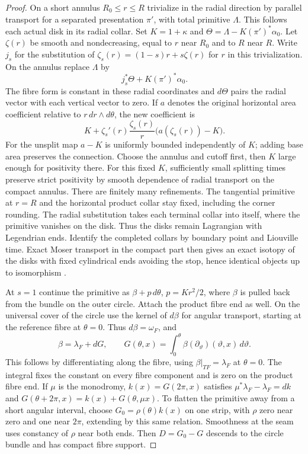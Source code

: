 \begin{proof}
On a short annulus $R_0\le r\le R$ trivialize in the radial direction by parallel transport for a separated presentation $\pi'$, with total primitive $\Lambda$. This follows each actual disk in its radial collar. Set $K=1+\kappa$ and $\Theta=\Lambda-K(\pi')^*\alpha_0$. Let $\zeta(r)$ be smooth and nondecreasing, equal to $r$ near $R_0$ and to $R$ near $R$. Write $j_s$ for the substitution of $\zeta_s(r)=(1-s)r+s\zeta(r)$ for $r$ in this trivialization. On the annulus replace $\Lambda$ by
\[
                         j_s^*\Theta+K(\pi')^*\alpha_0.
\]
The fibre form is constant in these radial coordinates and $d\Theta$ pairs the radial vector with each vertical vector to zero. If $a$ denotes the original horizontal area coefficient relative to $r\,dr\wedge d\theta$, the new coefficient is
\[
              K+\zeta_s'(r)\frac{\zeta_s(r)}{r}
                              \big(a(\zeta_s(r))-K\big).
\]
For the unsplit map $a-K$ is uniformly bounded independently of $K$; adding base area preserves the connection. Choose the annulus and cutoff first, then $K$ large enough for positivity there. For this fixed $K$, sufficiently small splitting times preserve strict positivity by smooth dependence of radial transport on the compact annulus. There are finitely many refinements. The tangential primitive at $r=R$ and the horizontal product collar stay fixed, including the corner rounding. The radial substitution takes each terminal collar into itself, where the primitive vanishes on the disk. Thus the disks remain Lagrangian with Legendrian ends. Identify the completed collars by boundary point and Liouville time. Exact Moser transport in the compact part then gives an exact isotopy of the disks with fixed cylindrical ends avoiding the stop, hence identical objects up to isomorphism \cite[Remark~2.30]{GPS}.

At $s=1$ continue the primitive as $\beta+p\,d\theta$, $p=Kr^2/2$, where $\beta$ is pulled back from the bundle on the outer circle. Attach the product fibre end as well. On the universal cover of the circle use the kernel of $d\beta$ for angular transport, starting at the reference fibre at $\theta=0$. Thus $d\beta=\omega_F$, and
\[
       \beta=\lambda_F+dG,\qquad
       G(\theta,x)=\int_0^\theta\beta(\partial_\vartheta)(\vartheta,x)\,d\vartheta .
\]
This follows by differentiating along the fibre, using $\beta|_{TF}=\lambda_F$ at $\theta=0$. The integral fixes the constant on every fibre component and is zero on the product fibre end. If $\mu$ is the monodromy, $k(x)=G(2\pi,x)$ satisfies $\mu^*\lambda_F-\lambda_F=dk$ and
$G(\theta+2\pi,x)=k(x)+G(\theta,\mu x)$. To flatten the primitive away from a short angular interval, choose $G_0=\rho(\theta)k(x)$ on one strip, with $\rho$ zero near zero and one near $2\pi$, extending by this same relation. Smoothness at the seam uses constancy of $\rho$ near both ends. Then $D=G_0-G$ descends to the circle bundle and has compact fibre support.


\end{proof}
